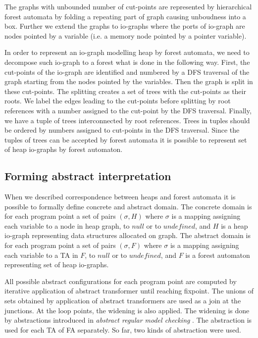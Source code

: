 \documentclass[a4paper, 12pt]{article}
\begin{document}
The graphs with unbounded number of cut-points are represented by hierarchical
forest automata by folding a repeating part of graph causing unboudness into a box.
Further we extend the graphs to io-graphs where the ports of io-graph are nodes pointed
by a variable (i.e. a memory node pointed by a pointer variable).

In order to represent an io-graph modelling heap by forest automata,
we need to decompose such io-graph to a forest what is done in the following way.
First, the cut-points of the io-graph are identified and numbered by
a DFS traversal of the graph starting from the nodes pointed by the variables.
Then the graph is split in these cut-points.
The splitting creates a set of trees with the cut-points as their roots.
We label the edges leading to the cut-points before splitting by root
references with a number assigned to the cut-point by the DFS traversal.
Finally, we have a tuple of trees interconnected by root references.
Trees in tuples should be ordered by numbers assigned to cut-points in the DFS traversal.
Since the tuples of trees can be accepted by forest automata it is
possible to represent set of heap io-graphs by forest automaton.

\subsection{Forming abstract interpretation}
When we described correspondence between heaps and forest automata
it is possible to formally define concrete and abstract domain.
The concrete domain is for each program point a set of pairs $(\sigma, H)$
where $\sigma$ is a mapping assigning each variable to a node in heap graph,
to $null$ or to $undefined$, and $H$ is a heap io-graph representing data
structures allocated on graph.
The abstract domain is for each program point a set of pairs $(\sigma, F)$
where $\sigma$ is a mapping assigning each variable to a TA in $F$,
to $null$ or to $undefined$, and $F$ is a forest automaton representing
set of heap io-graphs.

All possible abstract configurations for each program point are computed by
iterative application of abstract transformer until reaching fixpoint.
The unions of sets obtained by application of abstract transformers are used
as a join at the junctions.
At the loop points, the widening is also applied.
The widening is done by abstractions introduced in \emph{abstract regular model checking} \cite{artmc}.
The abstraction is used for each TA of FA separately.
So far, two kinds of abstraction were used.
\end{document}
